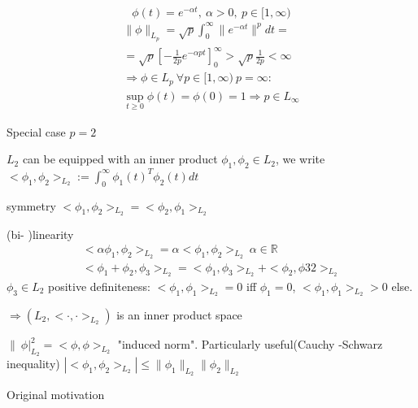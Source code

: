 \begin{Example}
\begin{equation*}
\phi (t) = e^{- \alpha t}, \ \alpha > 0, \ p \in [1,\infty )
\end{equation*}
\begin{equation*}
\begin{split}
\|\phi \|_{L_p} = \sqrt{p}{\int_0^{\infty} \|e^{-\alpha t}\|^p dt} = \\
= \sqrt{p}{[-\frac{1}{2p}e^{-\alpha pt}]_0^{\infty}} > \sqrt{p}{\frac{1}{2p}} < \infty \\
\Rightarrow \phi \in L_p \ \forall p \in [1, \infty) \ p= \infty : \\
\sup_{t \geq 0} \phi (t) = \phi (0) = 1 \Rightarrow p \in L_{\infty}
\end{split}
\end{equation*}
\end{Example}

Special case $p = 2$ 

$L_2$ can be equipped with an inner product $\phi_1, \phi_2 \in L_2$, we write $<\phi_1, \phi_2>_{L_2} :=  \int_0^{\infty} \phi_1(t)^T\phi_2(t)dt$

symmetry $<\phi_1, \phi_2>_{L_2} = <\phi_2, \phi_1>_{L_2}$

(bi- )linearity 
\begin{equation*}
\begin{split}
<\alpha \phi_1, \phi_2>_{L_2} = \alpha <\phi_1, \phi_2>_{L_2} \ \alpha \in \mathbb{R} \\ 
<\phi_1 + \phi_2, \phi_3>_{L_2} = <\phi_1, \phi_3>_{L_2} + <\phi_2, \phi32>_{L_2}
\end{split}
\end{equation*}
$\phi_3 \in L_2$ 
positive definiteness: $<\phi_1, \phi_1>_{L_2} = 0$ iff $\phi_1 = 0$, $<\phi_1, \phi_1>_{L_2} > 0$ else.

$\Rightarrow (L_2, <\cdot, \cdot>_{L_2})$ is an inner product space

$\|\ \phi|_{L_2}^2 = < \phi, \phi>_{L_2}$ "induced norm". Particularly useful(Cauchy -Schwarz inequality) $|<\phi_1,\phi_2>_{L_2}| \leq \|\phi_1\|_{L_2}\|\phi_2\|_{L_2}$

Original motivation 



